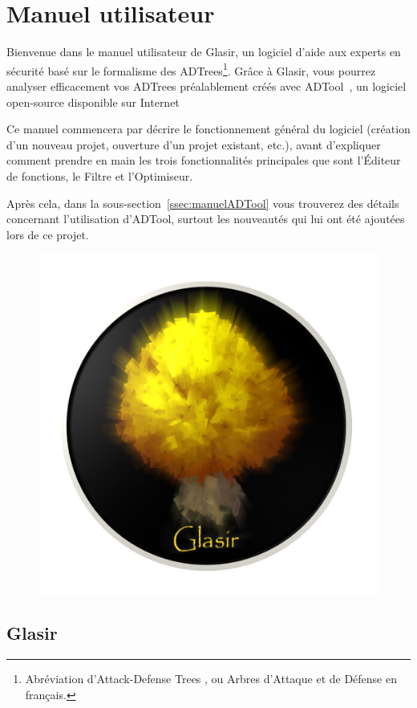 \section{Manuel utilisateur}
\label{sec:manuel}

Bienvenue dans le manuel utilisateur de Glasir, un logiciel d'aide aux experts en sécurité basé sur le formalisme des ADTrees\footnote{Abréviation d'\og Attack-Defense Trees \fg{}, ou \og Arbres d'Attaque et de Défense\fg{} en français.}. Grâce à Glasir, vous pourrez analyser efficacement vos ADTrees préalablement créés avec ADTool~\cite{adtool}, un logiciel open-source disponible sur Internet

Ce manuel commencera par décrire le fonctionnement général du logiciel (création d'un nouveau projet, ouverture d'un projet existant, etc.), avant d'expliquer comment prendre en main les trois fonctionnalités principales que sont l'Éditeur de fonctions, le Filtre et l'Optimiseur. 

Après cela, dans la {\sc sous-section}~\ref{ssec:manuelADTool} vous trouverez des détails concernant l'utilisation d'ADTool, surtout les nouveautés qui lui ont été ajoutées lors de ce projet.

	\begin{figure}[!h]
        \centering
        \includegraphics[height=0.3\textwidth]{figure/glasir.png}
    \end{figure}

\subsection{Glasir}
\label{ssec:manuelGlasir}


